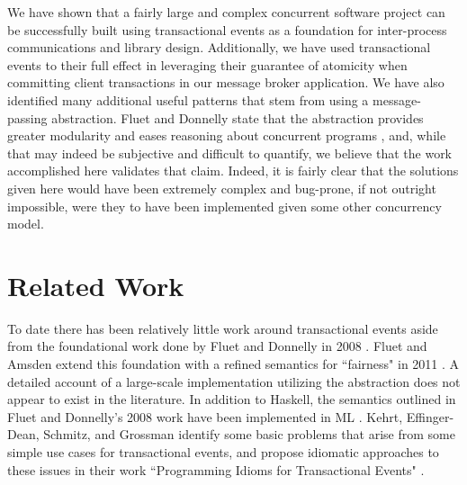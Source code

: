 \documentclass[conference, letterpaper]{IEEEtran}
\begin{document}
We have shown that a fairly large and complex concurrent software project can be successfully built using transactional events as a foundation for inter-process communications and library design. Additionally, we have used transactional events to their full effect in leveraging their guarantee of atomicity when committing client transactions in our message broker application. We have also identified many additional useful patterns that stem from using a message-passing abstraction. Fluet and Donnelly state that the abstraction provides greater modularity and eases reasoning about concurrent programs \cite{te:original}, and, while that may indeed be subjective and difficult to quantify, we believe that the work accomplished here validates that claim. Indeed, it is fairly clear that the solutions given here would have been extremely complex and bug-prone, if not outright impossible, were they to have been implemented given some other concurrency model.

\section{Related Work}
To date there has been relatively little work around transactional events aside from the foundational work done by
Fluet and Donnelly in 2008 \cite{te:original}. Fluet and Amsden extend this foundation with a refined semantics  for ``fairness" in 2011 \cite{te:fairness}.
A detailed account of a large-scale implementation utilizing the abstraction does not appear to exist in the literature. 
In addition to Haskell, the semantics outlined in Fluet and Donnelly's 2008 work have been implemented in ML \cite{te:ml}. 
Kehrt, Effinger-Dean, Schmitz, and Grossman identify some basic problems that arise from some simple use cases for
transactional events, and propose idiomatic approaches to these issues in their work ``Programming Idioms for Transactional Events" \cite{te:idioms}.  




\end{document}
